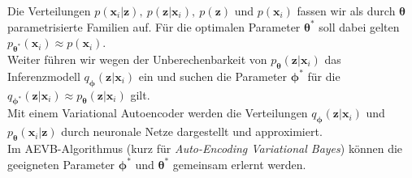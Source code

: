 \documentclass[12pt]{article}
\newcommand{\z}{\mathbf{z}}
\newcommand{\x}{\mathbf{x}_i}
\begin{document}
	Die Verteilungen $p(\x|\z),\ p(\z|\x),\ p(\z)$ und $p(\x)$ fassen wir als durch ${\boldsymbol\theta}$ parametrisierte Familien auf. Für die optimalen Parameter $\boldsymbol\theta^{*}$ soll dabei gelten $p_{\boldsymbol\theta^{*}}(\x) \approx p(\x)$.\\
	Weiter führen wir wegen der Unberechenbarkeit von $p_{\boldsymbol\theta}(\z|\x)$ das Inferenzmodell $q_{\boldsymbol\phi}(\z|\x)$ ein und suchen die Parameter $\boldsymbol\phi^{*}$ für die $q_{\boldsymbol\phi^{*}}(\z|\x) \approx p_{\boldsymbol\theta}(\z|\x)$ gilt.\\ 
	Mit einem Variational Autoencoder werden die Verteilungen $q_{\boldsymbol\phi}(\z|\x)$ und $p_{\boldsymbol\theta}(\x|\z)$ durch neuronale Netze dargestellt und approximiert.\\
	Im AEVB-Algorithmus (kurz für \emph{Auto-Encoding Variational Bayes}) können die geeigneten Parameter $\boldsymbol\phi^{*}$ und $\boldsymbol\theta^{*}$ gemeinsam erlernt werden.
\end{document}

